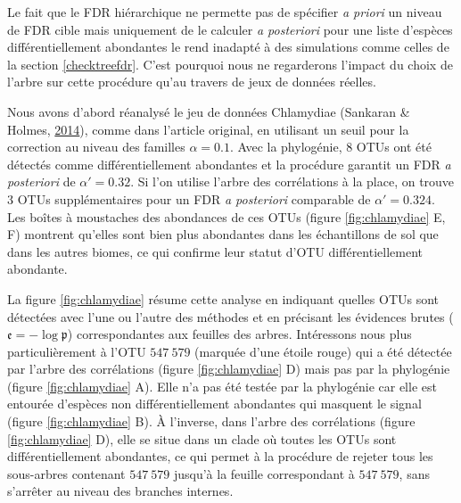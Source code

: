 \documentclass[12pt,a4paper]{reedthesis}
\newcommand \pv {\mathfrak{p}}
\theoremstyle{definition}
\theoremstyle{definition}
\theoremstyle{definition}
\theoremstyle{remark}
\begin{document}
Le fait que le FDR hiérarchique ne permette pas de spécifier \emph{a priori} un niveau de FDR cible mais uniquement de le calculer \emph{a posteriori} pour une liste d'espèces différentiellement abondantes le rend inadapté à des simulations comme celles de la section \ref{checktreefdr}. C'est pourquoi nous ne regarderons l'impact du choix de l'arbre sur cette procédure qu'au travers de jeux de données réelles.

Nous avons d'abord réanalysé le jeu de données Chlamydiae (Sankaran \& Holmes, \protect\hyperlink{ref-sankaran2014structssi}{2014}), comme dans l'article original, en utilisant un seuil pour la correction au niveau des familles \(\alpha = 0.1\). Avec la phylogénie, \(8\) OTUs ont été détectés comme différentiellement abondantes et la procédure garantit un FDR \emph{a posteriori} de \(\alpha'=0.32\). Si l'on utilise l'arbre des corrélations à la place, on trouve \(3\) OTUs supplémentaires pour un FDR \emph{a posteriori} comparable de \(\alpha'=0.324\). Les boîtes à moustaches des abondances de ces OTUs (figure \ref{fig:chlamydiae} E, F) montrent qu'elles sont bien plus abondantes dans les échantillons de sol que dans les autres biomes, ce qui confirme leur statut d'OTU différentiellement abondante.

La figure \ref{fig:chlamydiae} résume cette analyse en indiquant quelles OTUs sont détectées avec l'une ou l'autre des méthodes et en précisant les évidences brutes (\(\mathfrak{e} = -\log\pv\)) correspondantes aux feuilles des arbres. Intéressons nous plus particulièrement à l'OTU \(547~579\) (marquée d'une étoile rouge) qui a été détectée par l'arbre des corrélations (figure \ref{fig:chlamydiae} D) mais pas par la phylogénie (figure \ref{fig:chlamydiae} A). Elle n'a pas été testée par la phylogénie car elle est entourée d'espèces non différentiellement abondantes qui masquent le signal (figure \ref{fig:chlamydiae} B). À l'inverse, dans l'arbre des corrélations (figure \ref{fig:chlamydiae} D), elle se situe dans un clade où toutes les OTUs sont différentiellement abondantes, ce qui permet à la procédure de rejeter tous les sous-arbres contenant \(547~579\) jusqu'à la feuille correspondant à \(547~579\), sans s'arrêter au niveau des branches internes.
\end{document}
